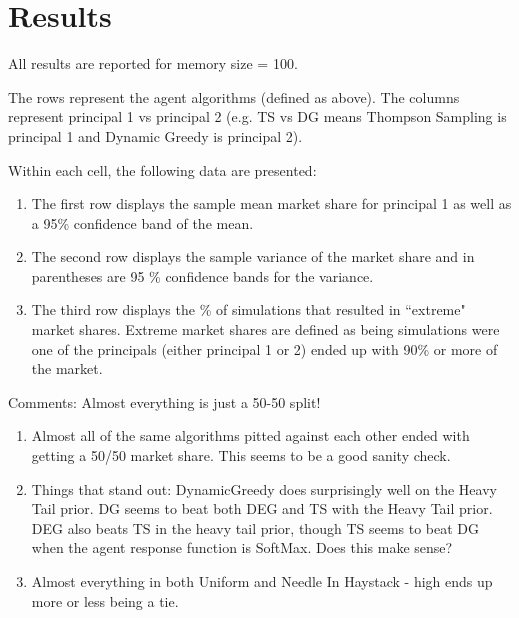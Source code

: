 \documentclass[11pt,letterpaper]{article}
\begin{document}
\section*{Results}
All results are reported for memory size = 100. \\
\vspace{0.25cm}

The rows represent the agent algorithms (defined as above). The columns represent principal 1 vs principal 2 (e.g. TS vs DG means Thompson Sampling is principal 1 and Dynamic Greedy is principal 2).  \\
\vspace{0.1cm}

Within each cell, the following data are presented: \\

\begin{enumerate}
\item The first row displays the sample mean market share for principal 1 as well as a 95\% confidence band of the mean.

\item The second row displays the sample variance of the market share and in parentheses are 95 \% confidence bands for the variance.

\item The third row displays the \% of simulations that resulted in ``extreme" market shares. Extreme market shares are defined as being simulations were one of the principals (either principal 1 or 2) ended up with 90\% or more of the market.
\end{enumerate}

Comments: Almost everything is just a 50-50 split!
\begin{enumerate}
\item Almost all of the same algorithms pitted against each other ended with getting a 50/50 market share. This seems to be a good sanity check.
\item Things that stand out: DynamicGreedy does surprisingly well on the Heavy Tail prior. DG seems to beat both DEG and TS with the Heavy Tail prior. DEG also beats TS in the heavy tail prior, though TS seems to beat DG when the agent response function is SoftMax. Does this make sense?
\item Almost everything in both Uniform and Needle In Haystack - high ends up more or less being a tie.
\end{enumerate}
\end{document}
